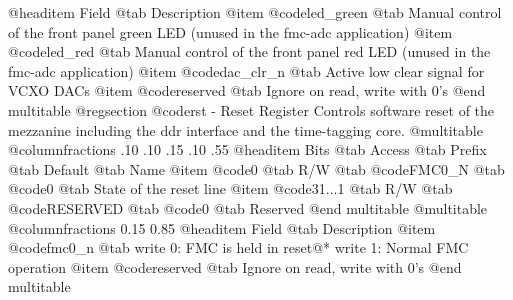@headitem Field @tab Description
@item @code{led_green} @tab Manual control of the front panel green LED (unused in the fmc-adc application)
@item @code{led_red} @tab Manual control of the front panel red LED (unused in the fmc-adc application)
@item @code{dac_clr_n} @tab Active low clear signal for VCXO DACs
@item @code{reserved} @tab Ignore on read, write with 0's
@end multitable
@regsection @code{rst} - Reset Register
Controls software reset of the mezzanine including the ddr interface and the time-tagging core.
@multitable @columnfractions .10 .10 .15 .10 .55
@headitem Bits @tab Access @tab Prefix @tab Default @tab Name
@item @code{0}
@tab R/W @tab
@code{FMC0_N}
@tab @code{0} @tab 
State of the reset line
@item @code{31...1}
@tab R/W @tab
@code{RESERVED}
@tab @code{0} @tab 
Reserved
@end multitable
@multitable @columnfractions 0.15 0.85
@headitem Field @tab Description
@item @code{fmc0_n} @tab write 0: FMC is held in reset@* write 1: Normal FMC operation
@item @code{reserved} @tab Ignore on read, write with 0's
@end multitable

